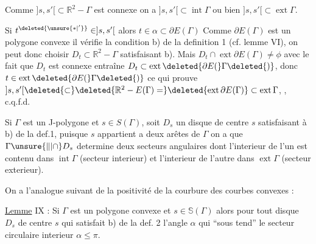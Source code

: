 Comme $]s,s'[\subset\mathbb{R}^{2}-\Gamma$ est connexe on a $]s,s'[\subset\operatorname{int}\Gamma$ ou bien $]s,s'[\subset\operatorname{ext}\Gamma$.

Si $t^{\deleted{\unsure{*|'}}}\in ]s,s'[$ alors $t\in\alpha\subset\partial E(\Gamma)$  Comme $\partial E(\Gamma)$ est un polygone convexe il vérifie la condition b) de la definition 1 (cf. lemme VI), on peut donc choisir $D_t\subset\mathbb{R}^{2}-\Gamma$ satisfaisant b). Mais $D_t\cap\operatorname{ext}\partial E(\Gamma)\ne\phi$  avec le fait que $D_t$ est connexe entraîne $D_t\subset\operatorname{ext}\deleted{\partial E(}\Gamma\deleted{)}$, donc $t\in\operatorname{ext}\deleted{\partial E(}\Gamma\deleted{)}$ ce qui prouve  $]s,s'[\deleted{\subset}\deleted{\mathbb{R}^{2}-E(\Gamma)=}\deleted{\operatorname{ext}\partial E(\Gamma)}\subset\operatorname{ext}\Gamma$, , c.q.f.d.

Si $\Gamma$ est un J-polygone et $s\in S(\Gamma)$, soit $D_s$ un disque de centre $s$ satisfaisant à b) de la def.1, puisque $s$ appartient a deux arêtes de $\Gamma$ on a que $\Gamma\unsure{\Vert|\cap}D_s$ determine deux secteurs angulaires dont l'interieur de l'un est contenu dans $\operatorname{int}\Gamma$ (secteur interieur) et l'interieur de l'autre dans $\operatorname{ext}\Gamma$ (secteur exterieur).

\margin{$\unsure{\cdot|\bullet}$}
On a   l'analogue suivant de la positivité de la courbure des courbes  convexes :

\uline{Lemme} IX : Si $\Gamma$ est un polygone convexe et $s\in\mathbb{S}(\Gamma)$ alors pour tout disque $D_s$ de centre $s$ qui satisfait b) de la def. 2 l'angle $\alpha$ qui ``sous tend'' le secteur circulaire interieur  $\alpha\le\pi$.

